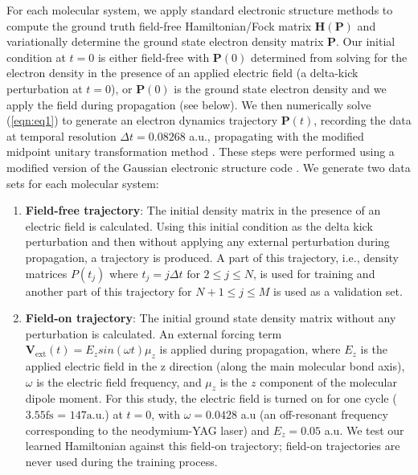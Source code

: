 \documentclass[10pt]{article}
\begin{document}
For each molecular system, we apply standard electronic structure methods to compute the ground truth field-free Hamiltonian/Fock matrix $\mathbf{H}(\mathbf{P})$ and variationally determine the ground state electron density matrix $\mathbf{P}$. Our initial condition at $t=0$ is either field-free with $\mathbf{P}(0)$ determined from solving for the electron density in the presence of an applied electric field (a delta-kick perturbation at $t=0$), or $\mathbf{P}(0)$ is the ground state electron density and we apply the field during propagation (see below).  We then numerically solve (\ref{eqn:eq1}) to generate an electron dynamics trajectory $\mathbf{P}(t)$, recording the data at temporal resolution $\Delta t = 0.08268$ a.u., propagating with the modified midpoint unitary transformation method \cite{Li2005, SSL2007}. These steps were performed using a modified version of the Gaussian electronic structure code \cite{GaussianDV}. We generate two data sets for each molecular system:
\begin{enumerate}[1.]
\item \textbf{Field-free trajectory}: The initial density matrix in the presence of an electric field is calculated. Using this initial condition as the delta kick perturbation and then without applying any external perturbation during propagation, a trajectory is produced. A part of this trajectory, i.e., density matrices $P(t_j)$ where $t_j = j\Delta t \text{ for } 2\leq j \leq N$, is used for training and another part of this trajectory for $ N+1\leq j \leq M$ is used as a validation set.

\item \textbf{Field-on trajectory}: The initial ground state density matrix without any perturbation is calculated.  An external forcing term $\mathbf{V}_{\text{ext}}(t) =  E_z sin(\omega t)\mu_z$ is applied during propagation, where $E_z$ is the applied electric field in the z direction (along the main molecular bond axis), $\omega$ is the electric field frequency, and $\mu_z$ is the $z$ component of the molecular dipole moment. For this study, the electric field is turned on for one cycle ($3.55 \text{fs}$ = $147 \text{a.u.}$) at $t=0$, with $\omega = 0.0428$ a.u (an off-resonant frequency corresponding to the neodymium-YAG laser) and $E_z = 0.05$ a.u. We test our learned Hamiltonian against this field-on trajectory; field-on trajectories are never used during the training process.  

\end{enumerate}
\end{document}
